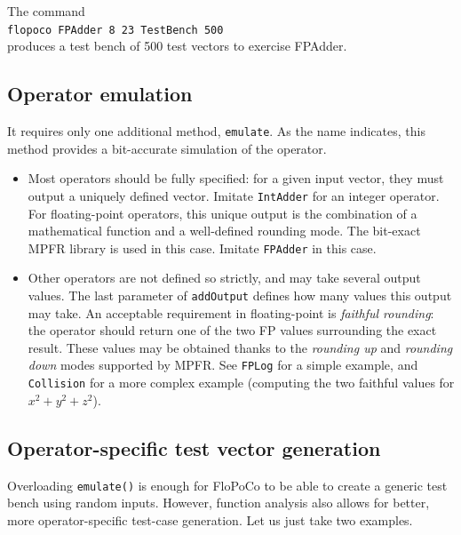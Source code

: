 \documentclass{article}
\begin{document}
The command\\
 \texttt{flopoco FPAdder 8 23 TestBench 500} \\
produces a test bench of 500 test vectors to exercise FPAdder.

\subsection{Operator emulation}


It requires only one additional method, \texttt{emulate}. As the name
indicates, this method provides a bit-accurate simulation of the operator. 
\begin{itemize}
\item Most operators should be fully specified: for a given input
  vector, they must output a uniquely defined vector. Imitate
  \texttt{IntAdder} for an integer operator. For floating-point
  operators, this unique output is the combination of a mathematical
  function and a well-defined rounding mode. The bit-exact MPFR
  library is used in this case. Imitate \texttt{FPAdder} in this case.

\item Other operators are not defined so strictly, and may take
  several output values. The last parameter of \texttt{addOutput}
  defines how many values this output may take. An acceptable
  requirement in floating-point is \emph{faithful rounding}: the
  operator should return one of the two FP values surrounding the
  exact result. These values may be obtained thanks to the
  \emph{rounding up} and \emph{rounding down} modes supported by
  MPFR. See \texttt{FPLog} for a simple example, and
  \texttt{Collision} for a more complex example (computing the two
  faithful values for $x^2+y^2+z^2$).
\end{itemize}

\subsection{Operator-specific test  vector generation}
Overloading \texttt{\small emulate()} is enough for FloPoCo to be able
to create a generic test bench using random inputs. However, function
analysis also allows for better, more operator-specific test-case
generation. Let us just take two examples.
\end{document}
